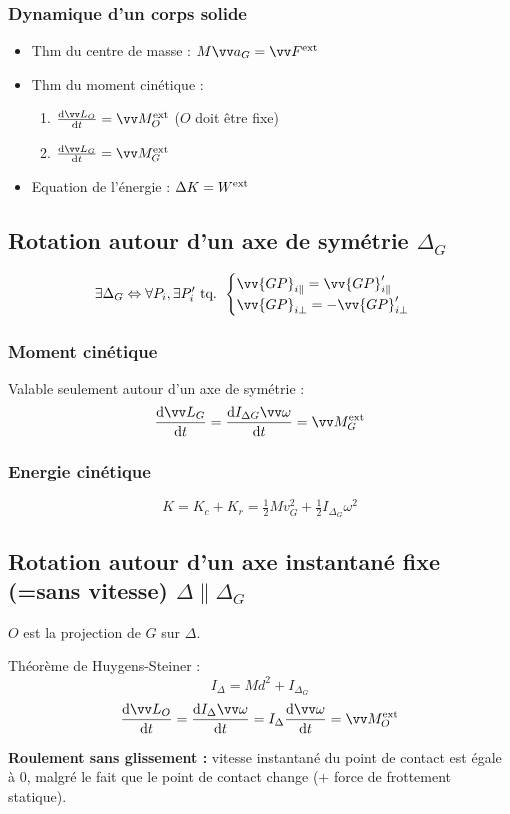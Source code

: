 \documentclass[../main.tex]{subfiles}
\begin{document}
\subsubsection{Dynamique d'un corps solide}
\begin{itemize}
  \item Thm du centre de masse : \( M\ac_G = \F^{\exte} \)
  \item Thm du moment cinétique : 
    \begin{enumerate}
      \item \(\dv{\mc_O}{t} = \mf_O^{\exte}\) (\(O\) doit être fixe)
      \item \(\dv{\mc_G}{t} = \mf_G^{\exte}\)
    \end{enumerate} 
  \item Equation de l'énergie : \(\Delta K = W^{\text{ext}}\)
\end{itemize}

\subsection{Rotation autour d'un axe de symétrie \(\Delta_G\)}
\[
  \exists \Delta_G \Leftrightarrow \forall P_i, \exists P_i' \text{ tq. } 
  \begin{cases}
    \vv{GP}_{i\parallel}=\vv{GP}_{i\parallel}'\\
    \vv{GP}_{i\bot}=-\vv{GP}_{i\bot}'\\
  \end{cases}
\]

\subsubsection{Moment cinétique}
Valable seulement autour d'un axe de symétrie : 
\[
  \dv{\mc_G}{t} = \dv{I_{\Delta G}\vian}{t}=\mf^{\exte}_G
\]
\subsubsection{Energie cinétique}
\[
  K = K_c + K_r = \tfrac{1}{2}Mv_G^2 + \tfrac{1}{2}I_{\Delta_G}\omega^2
\]

\subsection{Rotation autour d'un axe instantané fixe (=sans vitesse) \(\Delta \parallel \Delta_G\)}
\(O\) est la projection de \(G\) sur \(\Delta\).

Théorème de Huygens-Steiner : 
\[
  I_{\Delta} = Md^2 + I_{\Delta_G}
\]
\[
  \dv{\mc_O}{t} = \dv{I_{\Delta}\vian}{t} = I_{\Delta}\dv{\vian}{t}=\mf_O^{\exte}
\]

\textbf{Roulement sans glissement : } vitesse instantané du point de contact est égale à 0, malgré le fait que le point de contact change (+ force de frottement statique).
\end{document}
